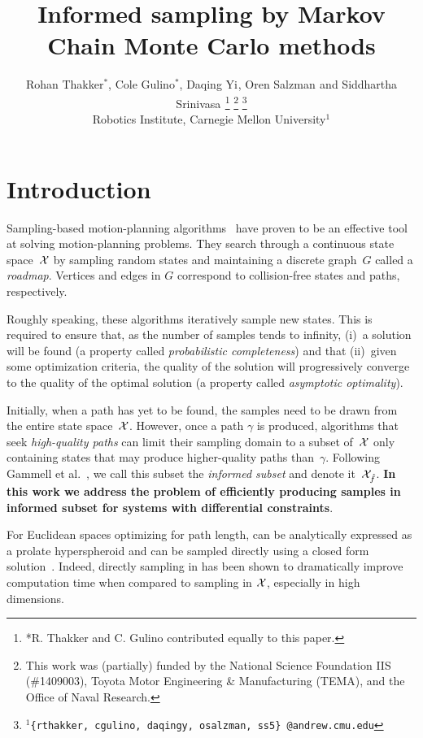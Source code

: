 \documentclass[letterpaper, 10 pt, conference]{ieeeconf}  %
\title{\LARGE \bf
Informed sampling by Markov Chain Monte Carlo methods
}
\author{
Rohan Thakker$^{*}$,
Cole Gulino$^{*}$,
Daqing Yi$^{}$,
Oren Salzman$^{}$ and
Siddhartha Srinivasa$^{}$%
\thanks{*R. Thakker and C. Gulino contributed equally to this paper.}
\thanks{This work was (partially) funded by the National Science Foundation IIS (\#1409003), Toyota Motor Engineering \& Manufacturing (TEMA), and the Office of Naval Research.}%
\thanks{$^{1}${\tt\small \{rthakker, cgulino, daqingy, osalzman, ss5\} @andrew.cmu.edu}}%
%
\\        
Robotics Institute, Carnegie Mellon University$^{1}$
}
\begin{document}
\maketitle
\thispagestyle{empty}
\pagestyle{empty}


\begin{abstract}

\end{abstract}


\section{Introduction}
\label{sec:intro}


Sampling-based motion-planning algorithms~\cite{CBHKKLT05, L06} have proven to be an effective tool at solving motion-planning problems.
They search through a continuous state space~$\mathcal{X}$ by sampling random states and maintaining a discrete graph~$G$ called a \emph{roadmap}.
Vertices and edges in $G$ correspond to collision-free states and paths, respectively.

Roughly speaking, these algorithms iteratively sample new states.
This is required to ensure that, as the number of samples tends to infinity, 
(i)~a solution will be found 
(a property called \emph{probabilistic completeness})
and that
(ii)~given some optimization criteria, the quality of the solution will progressively converge to the quality of the optimal solution
(a property called \emph{asymptotic  optimality}).

Initially, 
when a path has yet to be found, 
the samples need to be drawn from the entire state space~$\mathcal{X}$.
However, once a path $\gamma$ is produced,  algorithms that seek \emph{high-quality paths} can limit their sampling domain to a subset of~$\mathcal{X}$ only  containing states that may produce higher-quality paths than~$\gamma$.
Following Gammell et al.~\cite{GSB14}, we call this subset the \emph{informed subset} and denote it~$\mathcal{X}_{\hat{f}}$.
\textbf{In this work we address the problem of efficiently producing samples in informed subset for systems with differential constraints}. 

For Euclidean spaces optimizing for path length, 
\Cinf can be analytically expressed as a prolate hyperspheroid and can be sampled directly using a closed form solution~\cite{GSB14}.
Indeed, directly sampling in \Cinf has been shown to dramatically improve computation time when compared to sampling in $\mathcal{X}$, especially in high dimensions. 
\end{document}
